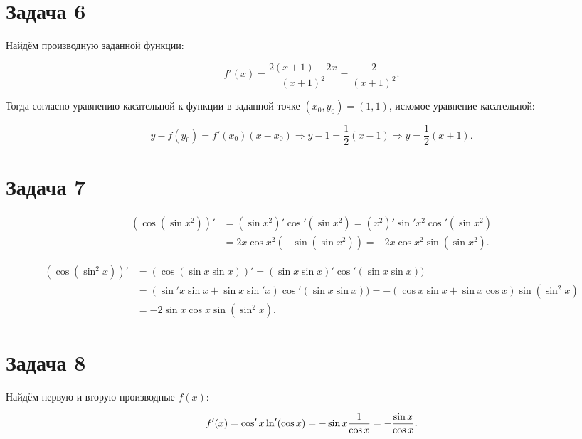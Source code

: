 \documentclass[a4paper,11pt]{article}
\begin{document}
\section{Задача 6}

Найдём производную заданной функции:

\begin{equation*}
f'(x) = \frac{2(x+1) - 2x}{(x+1)^2} = \frac{2}{(x+1)^2}.
\end{equation*}

Тогда согласно уравнению касательной к функции в заданной точке $(x_0, y_0) = (1, 1)$, искомое уравнение касательной:

\begin{equation*}
y - f(y_0) = f'(x_0)(x - x_0) \Rightarrow y - 1 = \frac{1}{2}(x-1) \Rightarrow y = \frac{1}{2}(x+1).
\end{equation*}

\section{Задача 7}

\begin{equation*}
\begin{split}
(\cos(\sin x^2))' & = (\sin x^2)'\cos'(\sin x^2) = (x^2)' \sin' x^2 \cos'(\sin x^2) \\
& = 2x \cos x^2 (-\sin (\sin x^2)) = - 2x \cos x^2 \sin (\sin x^2).
\end{split}
\end{equation*}

\begin{equation*}
\begin{split}
(\cos(\sin^2 x))' & = (\cos(\sin x \sin x))' = (\sin x \sin x)' \cos' (\sin x \sin x)) \\
& = (\sin' x \sin x + \sin x \sin' x) \cos' (\sin x \sin x)) = - (\cos x \sin x + \sin x \cos x) \sin (\sin^2 x) \\
& = -2 \sin x \cos x \sin (\sin^2 x).
\end{split}
\end{equation*}

\section{Задача 8}

Найдём первую и вторую производные $f(x)$:

\begin{equation*}
\label{eq:task8_der1}
f'(x)  = \cos' x \ln'(\cos x) = -\sin x \frac{1}{\cos x} = -\frac{\sin x}{\cos x}. \\
\end{equation*}
\end{document}
